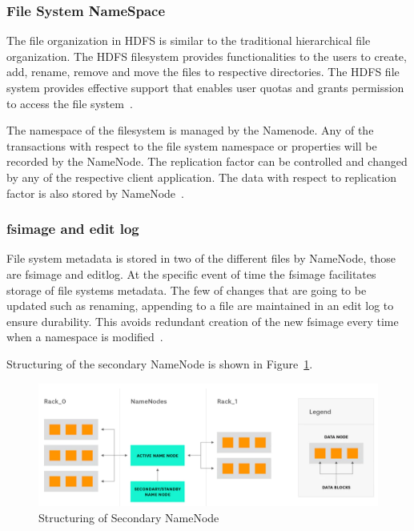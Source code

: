 \subsubsection{File System NameSpace}
The file organization in HDFS is similar to the traditional hierarchical file 
organization. The HDFS filesystem provides functionalities to the users to 
create, add, rename, remove and move the files to respective directories. 
The HDFS file system provides effective support that enables user quotas and 
grants permission to access the 
file system~\cite{hid-sp18-412-HDFS-Architecture}. 

The namespace of the filesystem is managed by the Namenode. Any of the 
transactions with respect to the file system namespace or properties will be 
recorded by the NameNode. The replication factor can be controlled and changed 
by any of the respective client application. The data with respect to 
replication factor is also stored by 
NameNode~\cite{hid-sp18-412-HDFS-Architecture}.

\subsubsection{fsimage and edit log}
File system metadata is stored in two of the different files by NameNode, those 
are fsimage and editlog. At the specific event of time the fsimage facilitates 
storage of file systems metadata. The few of changes that are going to be 
updated such as renaming, appending to a file are maintained in an edit log to 
ensure durability. This avoids redundant creation of the new fsimage every time 
when a namespace is modified~\cite{hid-sp18-412-hadoop-architecture-overview}. 

Structuring of the secondary NameNode is 
shown in Figure~\ref{s:secnode}.

\begin{figure}[!ht]
\centering
\includegraphics[width=\textwidth]{images/StructureOfSecondaryNode.png}
\caption{Structuring of Secondary 
NameNode~\cite{hid-sp18-412-hadoop-architecture-overview}}\label{s:secnode}
\end{figure}

